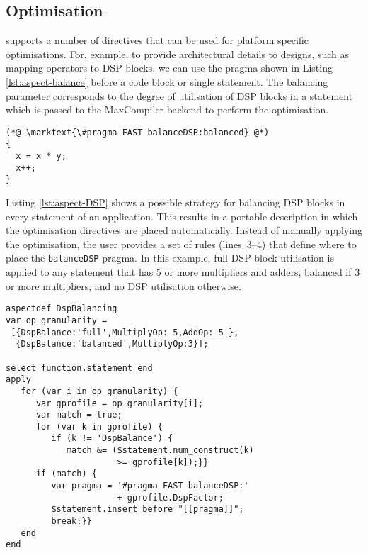 \subsection{Optimisation}
\label{sect:asp_ops}
\FAST{} supports a number of directives that can be used for platform
specific optimisations. For, example, to provide architectural details
to \FAST{} designs, such as mapping operators to DSP blocks, we can
use the \FAST{} pragma shown in Listing \ref{lst:aspect-balance}
before a code block or single statement. The balancing parameter
corresponds to the degree of utilisation of DSP blocks in a statement
which is passed to the MaxCompiler backend to perform the
optimisation.

\begin{lstlisting}[style=MaxC, label={lst:aspect-balance}, caption={The \FAST{}
    balancing pragma provides fine grained control over the mapping of
    computation to either DSPs or LUT/FF pairs.}]
(*@ \marktext{\#pragma FAST balanceDSP:balanced} @*)
{
  x = x * y;
  x++;
}
\end{lstlisting}

Listing \ref{lst:aspect-DSP} shows a possible strategy for balancing
DSP blocks in every statement of an application. This results in a
portable description in which the optimisation directives are placed
automatically. Instead of manually applying the optimisation, the user
provides a set of rules (lines~3--4) that define where to place the
\texttt{balanceDSP} pragma. In this example, full DSP block
utilisation is applied to any statement that has 5 or more multipliers
and adders, balanced if 3 or more multipliers, and no DSP utilisation
otherwise.


\begin{lstlisting}[style=lara, label={lst:aspect-DSP}, caption= {Aspect for exploring mapping of computation to DSP blocks.}]
aspectdef DspBalancing
var op_granularity =
 [{DspBalance:'full',MultiplyOp: 5,AddOp: 5 },
  {DspBalance:'balanced',MultiplyOp:3}];

select function.statement end
apply
   for (var i in op_granularity) {
      var gprofile = op_granularity[i];
      var match = true;
      for (var k in gprofile) {
         if (k != 'DspBalance') {
            match &= ($statement.num_construct(k)
                      >= gprofile[k]);}}
      if (match) {
         var pragma = '#pragma FAST balanceDSP:'
                      + gprofile.DspFactor;
         $statement.insert before "[[pragma]]";
         break;}}
   end
end
\end{lstlisting}


